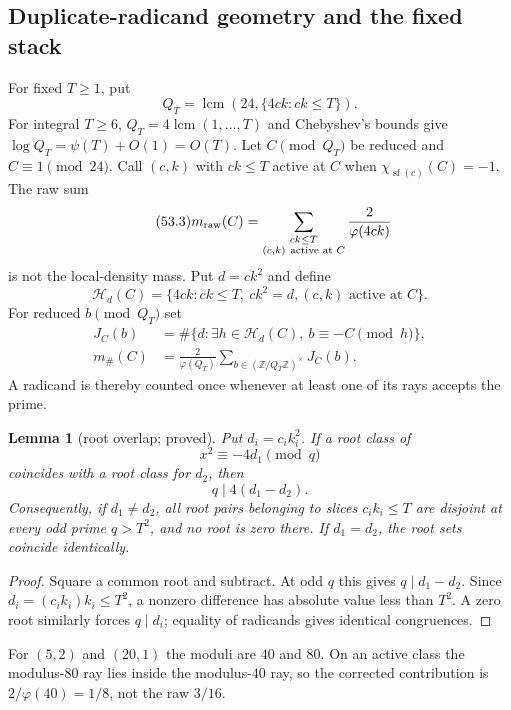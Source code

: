 \documentclass[10pt,reqno]{amsart}
\newtheorem{lemma}[theorem]{Lemma}
\theoremstyle{definition}
\newcommand{\lcm}{\operatorname {lcm}}
\newcommand{\1}{\mathbf 1}
\begin{document}
\subsection{Duplicate-radicand geometry and the fixed stack}
For fixed $T\geq1$, put
\begin{equation}\tag{53.2}
                  Q_T=\lcm(24,\{4ck:ck\leq T\}).
\end{equation}
For integral $T\geq6$, $Q_T=4\lcm(1,\ldots,T)$ and Chebyshev's bounds give
$\log Q_T=\psi(T)+O(1)=O(T)$.  Let $C\pmod {Q_T}$ be reduced and
$C\equiv1\pmod {24}$.  Call $(c,k)$ with $ck\leq T$ active at $C$ when
$\chi_{\operatorname {sf}(c)}(C)=-1$.  The raw sum
\begin{equation}\tag{53.3}
 m_{\rm raw}(C)=
 \sum_{\substack{ck\leq T\\(c,k)\ \text{active at }C}}
                   \frac2{\varphi(4ck)}
\end{equation}
is not the local-density mass.  Put $d=ck^2$ and define
\begin{equation}\tag{53.4}
 \mathcal H_d(C)=\{4ck:ck\leq T,\ ck^2=d,
                              (c,k)\text{ active at }C\}.
\end{equation}
For reduced $b\pmod {Q_T}$ set
\begin{equation}\tag{53.5}
 \begin{split}
 J_C(b)&=\#\{d:\exists h\in\mathcal H_d(C),\ b\equiv-C\pmod h\},\\
 m_\#(C)&=\frac2{\varphi(Q_T)}
       \sum_{b\in(\mathbb Z/Q_T\mathbb Z)^\times}J_C(b).
 \end{split}
\end{equation}
A radicand is thereby counted once whenever at least one of its rays accepts
the prime.

\begin{lemma}[root overlap; proved]\label{lem:root-overlap}
Put $d_i=c_i k_i^2$.  If a root class of
\begin{equation}\tag{53.6}
                         x^2\equiv-4d_1\pmod q
\end{equation}
coincides with a root class for $d_2$, then
\begin{equation}\tag{53.7}
                              q\mid4(d_1-d_2).
\end{equation}
Consequently, if $d_1\ne d_2$, all root pairs belonging to slices
$c_i k_i\leq T$ are disjoint at every odd prime $q>T^2$, and no root is
zero there.  If $d_1=d_2$, the root sets coincide identically.
\end{lemma}
\begin{proof}
Square a common root and subtract.  At odd $q$ this gives
$q\mid d_1-d_2$.  Since $d_i=(c_i k_i)k_i\leq T^2$, a nonzero difference
has absolute value less than $T^2$.  A zero root similarly forces
$q\mid d_i$; equality of radicands gives identical congruences.
\end{proof}
For $(5,2)$ and $(20,1)$ the moduli are $40$ and $80$.  On an active class
the modulus-$80$ ray lies inside the modulus-$40$ ray, so the corrected
contribution is $2/\varphi(40)=1/8$, not the raw $3/16$.
\end{document}
